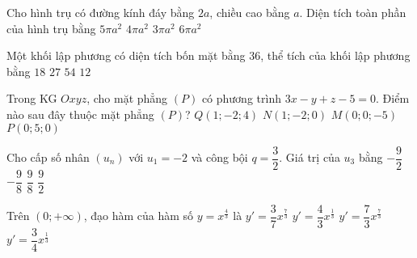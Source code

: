\begin{ex}%
	Cho hình trụ có đường kính đáy bằng $2a$, chiều cao bằng $a$. Diện tích toàn phần của hình trụ bằng
	\choice
	{$5\pi a^2$}
	{\True $4\pi a^2$}
	{$3\pi a^2$}
	{$6\pi a^2$}
\end{ex}

\begin{ex}%
	Một khối lập phương có diện tích bốn mặt bằng $36$, thể tích của khối lập phương bằng
	\choice
	{$18$}
	{\True $27$}
	{$54$}
	{$12$}
\end{ex}

\begin{ex}%
	Trong KG $Oxyz$, cho mặt phẳng $(P)$ có phương trình $3x-y+z-5=0$. Điểm nào sau đây thuộc mặt phẳng $(P)$?
	\choice
	{$Q(1;-2;4)$}
	{\True $N(1;-2;0)$}
	{$M(0;0;-5)$}
	{$P(0;5;0)$}
\end{ex}

\begin{ex}%
	Cho cấp số nhân $(u_n)$ với $u_1=-2$ và công bội $q=\dfrac{3}{2}$. Giá trị của $u_3$ bằng
	\choice
	{\True $-\dfrac{9}{2}$}
	{$-\dfrac{9}{8}$}
	{$\dfrac{9}{8}$}
	{$\dfrac{9}{2}$}
\end{ex}

\begin{ex}%
	Trên $(0;+\infty )$, đạo hàm của hàm số $y=x^{\tfrac{4}{3}}$ là
	\choice
	{$y'=\dfrac{3}{7}x^{\tfrac{7}{3}}$}
	{\True $y'=\dfrac{4}{3}x^{\tfrac{1}{3}}$}
	{$y'=\dfrac{7}{3}x^{\tfrac{7}{3}}$}
	{$y'=\dfrac{3}{4}x^{\tfrac{1}{3}}$}
\end{ex}

